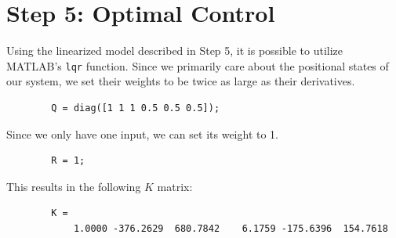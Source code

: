\documentclass{article}
\theoremstyle{definition}
\begin{document}
    \section*{Step 5: Optimal Control}
    Using the linearized model described in Step 5, it is possible
    to utilize MATLAB's \texttt{lqr} function.
    Since we primarily care about the positional states of our system,
    we set their weights to be twice as large as their derivatives.
    \begin{verbatim}
        Q = diag([1 1 1 0.5 0.5 0.5]);
    \end{verbatim}
    Since we only have one input, we can set its weight to 1.
    \begin{verbatim}
        R = 1;
    \end{verbatim}
    This results in the following $K$ matrix:
    \begin{verbatim}
        K =
            1.0000 -376.2629  680.7842    6.1759 -175.6396  154.7618
    \end{verbatim}
\end{document}
